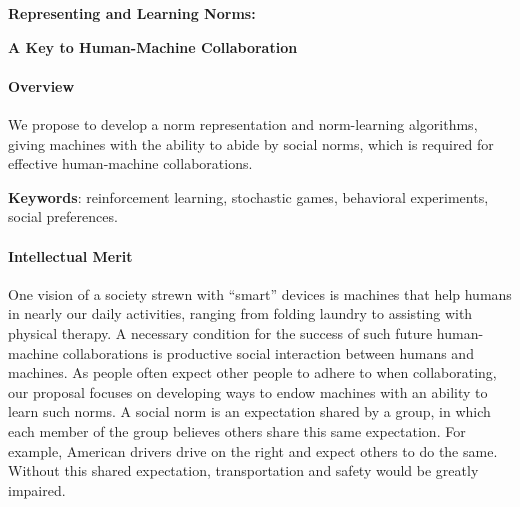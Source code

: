 
\centerline{\Large \bf Representing and Learning Norms:}

\vspace{\down}
\centerline{\large \bf A Key to Human-Machine Collaboration}

\vspace{\up}
\paragraph{Overview}


We propose to develop a norm representation and norm-learning
algorithms, giving machines with the ability to abide by social norms,
which is required for effective human-machine collaborations.

{\bf Keywords}: reinforcement learning, stochastic games, behavioral experiments, social preferences.

\vspace{\up}
\paragraph{Intellectual Merit}

One vision of a society strewn with ``smart'' devices is
machines that help humans in nearly our daily activities, 
ranging from folding laundry to assisting with physical therapy.
A necessary condition for the success of such future human-machine collaborations 
is productive social interaction between humans and machines.  As
people often expect other people to adhere to 
when collaborating, our proposal focuses on developing ways to endow
machines with an ability to learn such norms.
A social norm is an expectation shared by a group, in which each
member of the group believes others share this same expectation.  For
example, American drivers drive on the right and expect others to do
the same.  Without this shared expectation, transportation and safety
would be greatly impaired.


